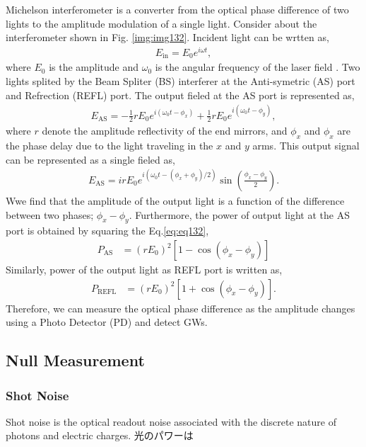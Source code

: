 Michelson interferometer is a converter from the optical phase difference of two lights to the amplitude modulation of a single light. Consider about the interferometer shown in Fig. \ref{img:img132}. Incident light can be wrtten as,
\begin{eqnarray}
  E_{\mathrm{in}} = E_{0} e^{i\omega{t}},
\end{eqnarray}
where $E_0$ is the amplitude and $\omega_0$ is the angular frequency of the laser field
. Two lights splited by the Beam Spliter (BS) interferer at the Anti-symetric (AS) port and Refrection (REFL) port. The output fieled at the AS port is represented as,
\begin{eqnarray}
  E_{\mathrm{AS}} = -\frac{1}{2}rE_{0} e^{i\left(\omega_{0} t-\phi_{x}\right)}+\frac{1}{2}r E_{0} e^{i\left(\omega_{0} t-\phi_{y}\right)},
\end{eqnarray}
where $r$ denote the amplitude reflectivity of the end mirrors, and $\phi_{x}$ and $\phi_{x}$ are the phase delay due to the light traveling in the $x$ and $y$ arms. This output signal can be represented as a single fieled as,
\begin{eqnarray}\label{eq:eq132}
E_{\mathrm{AS}} = i r E_{0} e^{i\left(\omega_{0} t-\left(\phi_{x}+\phi_{y}\right) / 2\right)} \sin \left(\frac{\phi_{x}-\phi_{y}}{2}\right).
\end{eqnarray}
Wwe find that the amplitude of the output light is a function of the difference between two phases; $\phi_{x}-\phi_{y}$. Furthermore, the power of output light at the AS port is obtained by squaring the Eq.\ref{eq:eq132}, 
\begin{eqnarray}
  P_{\mathrm{AS}} &=\left(r E_{0}\right)^{2}\left[1-\cos \left(\phi_{x}-\phi_{y}\right)\right] 
\end{eqnarray}
Similarly, power of the output light as REFL port is written as,
\begin{eqnarray}
  P_{\mathrm{REFL}} &=\left(r E_{0}\right)^{2}\left[1+\cos \left(\phi_{x}-\phi_{y}\right)\right].
\end{eqnarray}
Therefore, we can measure the optical phase difference as the amplitude changes using a Photo Detector (PD) and detect GWs.

\subsection{Null Measurement}

\subsubsection{Shot Noise}
Shot noise is the optical readout noise associated with the discrete nature of photons and electric charges. 光のパワーは

